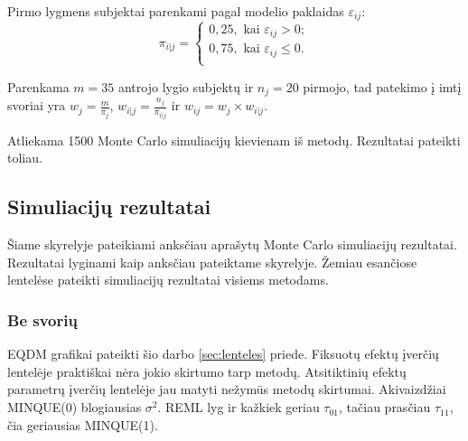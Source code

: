 \documentclass[12pt,a4paper]{article}
\begin{document}
\indent Pirmo lygmens subjektai parenkami pagal modelio paklaidas $\varepsilon_{ij}$:
\begin{equation}
\pi_{i|j}=
\left\{
\begin{array}{l}
0,25, \text{ kai } \varepsilon_{ij}>0;\\
0,75, \text{ kai } \varepsilon_{ij}\leq0.\\

\end{array} \right.
\end{equation}

\indent Parenkama $m=35$ antrojo lygio subjektų ir $n_j=20$ pirmojo, tad patekimo į imtį svoriai yra $w_j=\frac{m}{\pi_j}$, $w_{i|j}=\frac{n_j}{\pi_{i|j}}$ ir $w_{ij}=w_j\times w_{i|j}$.

\indent Atliekama 1500 Monte Carlo simuliacijų kievienam iš metodų. Rezultatai pateikti toliau.


\subsection{Simuliacijų rezultatai}
\indent Šiame skyrelyje pateikiami anksčiau aprašytų Monte Carlo simuliacijų rezultatai. Rezultatai lyginami kaip anksčiau pateiktame skyrelyje. Žemiau esančiose lentelėse pateikti simuliacijų rezultatai visiems metodams.

\subsubsection{Be svorių}
 EQDM grafikai pateikti šio darbo \ref{sec:lenteles} priede. Fiksuotų efektų įverčių lentelėje praktiškai nėra jokio skirtumo tarp metodų. Atsitiktinių efektų parametrų įverčių lentelėje jau matyti nežymūs metodų skirtumai. Akivaizdžiai MINQUE(0) blogiausias $\sigma^2$. REML lyg ir kažkiek geriau $\tau_{01}$, tačiau prasčiau $\tau_{11}$, čia geriausias MINQUE(1). 
\end{document}
